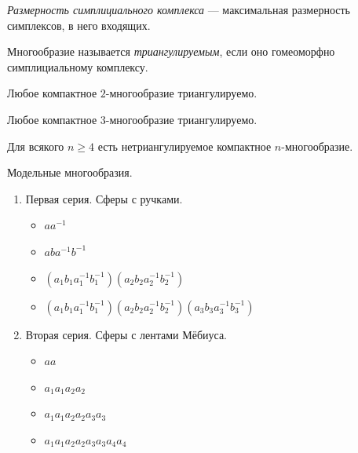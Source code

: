 \documentclass[12pt,a4paper]{article}
\begin{document}
    \begin{definition}
        \emph{Размерность симплициального комплекса} --- максимальная размерность симплексов, в него входящих.
    \end{definition}

    \begin{definition}
        Многообразие называется \emph{триангулируемым}, если оно гомеоморфно симплициальному комплексу.
    \end{definition}

    \begin{theorem}
        Любое компактное $2$-многообразие триангулируемо.
    \end{theorem}
    
    \begin{theorem}
        Любое компактное $3$-многообразие триангулируемо.
    \end{theorem}

    \begin{theorem}
        Для всякого $n \geqslant 4$ есть нетриангулируемое компактное $n$-многообразие.
    \end{theorem}

    \begin{definition}
        Модельные многообразия.
        \begin{enumerate}
            \item Первая серия. Сферы с ручками.
                \begin{itemize}
                    \item $a a^{-1}$
                    \item $a b a^{-1} b^{-1}$
                    \item $(a_1 b_1 a_1^{-1} b_1^{-1}) (a_2 b_2 a_2^{-1} b_2^{-1})$
                    \item $(a_1 b_1 a_1^{-1} b_1^{-1}) (a_2 b_2 a_2^{-1} b_2^{-1}) (a_3 b_3 a_3^{-1} b_3^{-1})$
                \end{itemize}
            \item Вторая серия. Сферы с лентами Мёбиуса.
                \begin{itemize}
                    \item $a a$
                    \item $a_1 a_1 a_2 a_2$
                    \item $a_1 a_1 a_2 a_2 a_3 a_3$
                    \item $a_1 a_1 a_2 a_2 a_3 a_3 a_4 a_4$
                \end{itemize}
        \end{enumerate}
    \end{definition}
\end{document}
